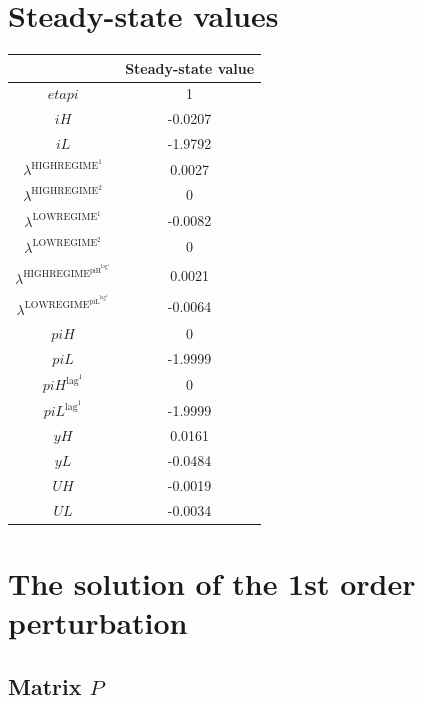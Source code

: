 

\section{Steady-state values}


\begin{tabular}{c|c|}
  & Steady-state value\\
\hline
${e\!t\!a\!p\!i}$ & 1 \\
${i\!H}$ & -0.0207 \\
${i\!L}$ & -1.9792 \\
$\lambda^{\mathrm{HIGHREGIME}^{\mathrm{1}}}$ & 0.0027 \\
$\lambda^{\mathrm{HIGHREGIME}^{\mathrm{2}}}$ & 0 \\
$\lambda^{\mathrm{LOWREGIME}^{\mathrm{1}}}$ & -0.0082 \\
$\lambda^{\mathrm{LOWREGIME}^{\mathrm{2}}}$ & 0 \\
$\lambda^{\mathrm{HIGHREGIME}^{\mathrm{piH}^{\mathrm{lag}^{\mathrm{1}}}}}$ & 0.0021 \\
$\lambda^{\mathrm{LOWREGIME}^{\mathrm{piL}^{\mathrm{lag}^{\mathrm{1}}}}}$ & -0.0064 \\
${p\!i\!H}$ & 0 \\
${p\!i\!L}$ & -1.9999 \\
${p\!i\!H}^{\mathrm{lag}^{\mathrm{1}}}$ & 0 \\
${p\!i\!L}^{\mathrm{lag}^{\mathrm{1}}}$ & -1.9999 \\
${y\!H}$ & 0.0161 \\
${y\!L}$ & -0.0484 \\
${U\!H}$ & -0.0019 \\
${U\!L}$ & -0.0034 \\
\hline
\end{tabular}


\section{The solution of the 1st order perturbation}

\subsection*{Matrix $P$}

